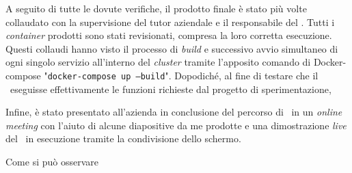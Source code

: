 A seguito di tutte le dovute verifiche, il prodotto finale è stato più volte collaudato con la supervisione del tutor aziendale e il responsabile del .
Tutti i \textit{container} prodotti sono stati revisionati, compresa la loro corretta esecuzione.
Questi collaudi hanno visto il processo di \textit{build} e successivo avvio simultaneo di ogni singolo servizio all'interno del \textit{cluster} tramite l'apposito comando di Docker-compose "\texttt{docker-compose up --build}".
Dopodiché, al fine di testare che il \software\ eseguisse effettivamente le funzioni richieste dal progetto di sperimentazione,

Infine, è stato presentato all'azienda in conclusione del percorso di \stage\ in un \textit{online meeting} con l'aiuto di alcune diapositive da me prodotte e una dimostrazione \textit{live} del \software\ in esecuzione tramite la condivisione dello schermo.

Come si può osservare
